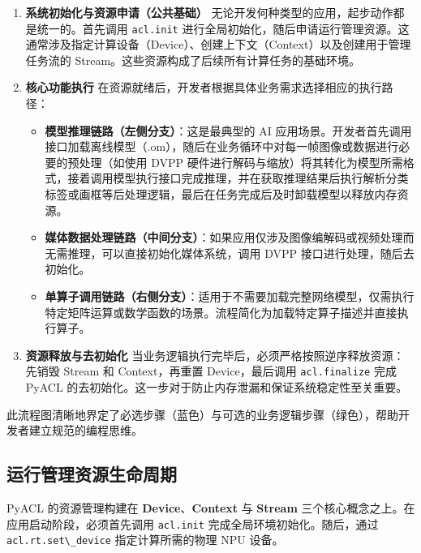 \begin{enumerate}
\def\labelenumi{\arabic{enumi}.}
\item
  \textbf{系统初始化与资源申请（公共基础）}
  无论开发何种类型的应用，起步动作都是统一的。首先调用
  \passthrough{\lstinline!acl.init!}
  进行全局初始化，随后申请运行管理资源。这通常涉及指定计算设备（Device）、创建上下文（Context）以及创建用于管理任务流的
  Stream。这些资源构成了后续所有计算任务的基础环境。
\item
  \textbf{核心功能执行}
  在资源就绪后，开发者根据具体业务需求选择相应的执行路径：

  \begin{itemize}
  \tightlist
  \item
    \textbf{模型推理链路（左侧分支）}：这是最典型的 AI
    应用场景。开发者首先调用接口加载离线模型（.om），随后在业务循环中对每一帧图像或数据进行必要的预处理（如使用
    DVPP
    硬件进行解码与缩放）将其转化为模型所需格式，接着调用模型执行接口完成推理，并在获取推理结果后执行解析分类标签或画框等后处理逻辑，最后在任务完成后及时卸载模型以释放内存资源。
  \item
    \textbf{媒体数据处理链路（中间分支）}：如果应用仅涉及图像编解码或视频处理而无需推理，可以直接初始化媒体系统，调用
    DVPP 接口进行处理，随后去初始化。
  \item
    \textbf{单算子调用链路（右侧分支）}：适用于不需要加载完整网络模型，仅需执行特定矩阵运算或数学函数的场景。流程简化为加载特定算子描述并直接执行算子。
  \end{itemize}
\item
  \textbf{资源释放与去初始化}
  当业务逻辑执行完毕后，必须严格按照逆序释放资源：先销毁 Stream 和
  Context，再重置 Device，最后调用
  \passthrough{\lstinline!acl.finalize!} 完成 PyACL
  的去初始化。这一步对于防止内存泄漏和保证系统稳定性至关重要。
\end{enumerate}

此流程图清晰地界定了必选步骤（蓝色）与可选的业务逻辑步骤（绿色），帮助开发者建立规范的编程思维。

\subsection{运行管理资源生命周期}\label{src-book-chapter4-h9}

PyACL 的资源管理构建在 \textbf{Device}、\textbf{Context} 与
\textbf{Stream} 三个核心概念之上。在应用启动阶段，必须首先调用
\passthrough{\lstinline!acl.init!} 完成全局环境初始化。随后，通过
\passthrough{\lstinline!acl.rt.set\_device!} 指定计算所需的物理 NPU
设备。

